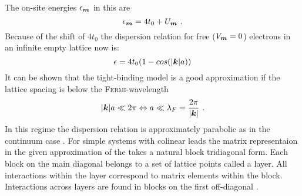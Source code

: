 The on-site energies $\epsilon_{\boldsymbol{m}}$ in this \hamil{} are
\begin{equation}
\epsilon_{\boldsymbol{m}} = 4t_0 + U_{\boldsymbol{m}}\ .
\end{equation}
Because of the shift of $4 t_0$ the dispersion relation for free ($V_{\boldsymbol{m}}=0$) electrons in an infinite empty lattice now is:
\begin{equation}
\epsilon = 4t_0(1-cos(\lvert\boldsymbol{k}\rvert a))
\end{equation}
It can be shown that the tight-binding model is a good approximation if the lattice spacing is below the \textsc{Fermi}-wavelength
\begin{equation}
\lvert\boldsymbol{k}\rvert a \ll  2\pi \Leftrightarrow a \ll \lambda_F = \frac{2\pi}{\lvert\boldsymbol{k}\rvert} \ .
\end{equation}
In this regime the dispersion relation is approximately parabolic as in the continuum case \cite{Metalidis2007Thesis}.
For simple systems with colinear leads the matrix representaion in the given approximation of the \hamil{} takes a natural block tridiagonal form. Each block on the main diagonal belongs to a set of lattice points called a layer. All interactions within the layer correspond to matrix elements within the block. Interactions across layers are found in blocks on the first off-diagonal \cite{AnLunNik2008}.

